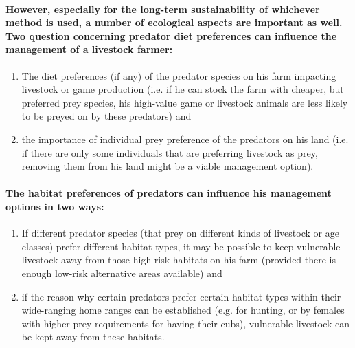 \paragraph{However, especially for the long-term sustainability of whichever
method is used, a number of ecological aspects are important as well.
Two question concerning predator diet preferences can influence the
management of a livestock farmer: }
\begin{enumerate}
\item The diet preferences (if any) of the predator species on his farm
impacting livestock or game production (i.e. if he can stock the farm
with cheaper, but preferred prey species, his high-value game or livestock
animals are less likely to be preyed on by these predators) and 
\item the importance of individual prey preference of the predators on his
land (i.e. if there are only some individuals that are preferring
livestock as prey, removing them from his land might be a viable management
option). 
\end{enumerate}

\paragraph{The habitat preferences of predators can influence his management
options in two ways: }
\begin{enumerate}
\item If different predator species (that prey on different kinds of livestock
or age classes) prefer different habitat types, it may be possible
to keep vulnerable livestock away from those high-risk habitats on
his farm (provided there is enough low-risk alternative areas available)
and 
\item if the reason why certain predators prefer certain habitat types within
their wide-ranging home ranges can be established (e.g. for hunting,
or by females with higher prey requirements for having their cubs),
vulnerable livestock can be kept away from these habitats. 
\end{enumerate}

